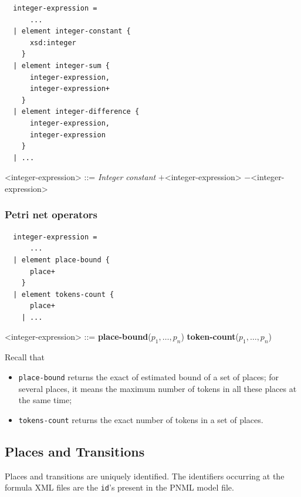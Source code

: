 \documentclass[10pt,english,a4paper]{article}
\newcommand\atomplacebnd[1]  {\textbf{place-bound}(#1)}
\newcommand\atomtokenscnt[1] {\textbf{token-count}(#1)}
\newcommand\exprplus         {\boldmath$+$\xspace}
\newcommand\exprminus        {\boldmath$-$\xspace}
\begin{document}
\begin{multicols}{2}
\begin{lstlisting}
  integer-expression =
      ...
  | element integer-constant {
      xsd:integer
    }
  | element integer-sum {
      integer-expression,
      integer-expression+
    }
  | element integer-difference {
      integer-expression,
      integer-expression
    }
  | ...
\end{lstlisting}
\columnbreak
\setlength{\grammarindent}{6em}
\begin{grammar}
<integer-expression> ::=
     \textit{Integer constant}
 \exprplus <integer-expression>
 \exprminus <integer-expression>
\end{grammar}
\end{multicols}

\clearpage
\subsubsection{Petri net operators}

\begin{multicols}{2}
\begin{lstlisting}
  integer-expression =
      ...
  | element place-bound {
      place+
    }
  | element tokens-count {
      place+
    | ...
\end{lstlisting}
\columnbreak
\begin{grammar}
<integer-expression> ::=
     \atomplacebnd{$p_1, \ldots, p_n$}
\alt \atomtokenscnt{$p_1, \ldots, p_n$}
\end{grammar}
\end{multicols}

Recall that
\begin{itemize}
  \item \lstinline!place-bound! returns the exact of estimated bound of a set of places;
    for several places, it means the maximum number of tokens in all these places at the same
    time;
  \item \lstinline!tokens-count! returns the exact number of tokens in a set of places.
\end{itemize}

\subsection{Places and Transitions}

Places and transitions are uniquely identified. The identifiers occurring at
the formula XML files are the \texttt{id}'s present in the PNML model file.
\end{document}
